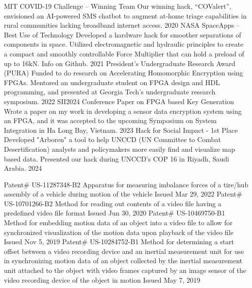 \documentclass[]{awesome-cv}
\begin{document}
\vspace{-15pt}
\begin{cvhonors}
	\cvhonor
	{MIT COVID-19 Challenge – Winning Team}
	{Our winning hack, “COValert”, envisioned an AI-powered SMS chatbot to augment at-home triage capabilities in rural communities lacking broadband internet access.}
	{}
	{2020}
	\cvhonor
	{NASA SpaceApps – Best Use of Technology}
	{Developed a hardware hack for smoother separations of components in space. Utilized electromagnetic and hydraulic principles to create a compact and smoothly controllable Force Multiplier that can hold a preload of up to 16kN. Info on Github.}
	{}
	{2021}
    \cvhonor
	{President's Undergraduate Research Award (PURA)}
	{Funded to do research on Accelerating Homomorphic Encryption using FPGAs. Mentored an undergraduate student on FPGA design and HDL programming, and presented at Georgia Tech's undergraduate research symposium.}
	{}
	{2022}
    \cvhonor
	{SII2024 Conference Paper on FPGA based Key Generation}
	{Wrote a paper on my work in developing a sensor data encryption system using an FPGA, and it was accepted to the upcoming Symposium on System Integration in Ha Long Bay, Vietnam.}
	{}
	{2023}
    \cvhonor
	{Hack for Social Impact - 1st Place}
	{Developed "Arboren" a tool to help UNCCD (UN Committee to Combat Desertification) analysts and policymakers more easily find and visualize map based data. Presented our hack during UNCCD's COP 16 in Riyadh, Saudi Arabia.}
	{}
	{2024}
\end{cvhonors}
\begin{cvhonors}
    \cvhonor
	{Patent\# US-11287348-B2}
	{Apparatus for measuring imbalance forces of a tire/hub assembly of a vehicle during motion of the vehicle}
	{}
	{Issued Mar 29, 2022}
	\cvhonor
	{Patent\# US-10701266-B2}
	{Method for reading out contents of a video file having a predefined video file format}
	{}
	{Issued Jun 30, 2020}
	\cvhonor
	{Patent\# US-10469750-B1}
	{Method for embedding motion data of an object into a video file to allow for synchronized visualization of the motion data upon playback of the video file}
	{}
	{Issued Nov 5, 2019}
	\cvhonor
	{Patent\# US-10284752-B1}
	{Method for determining a start offset between a video recording device and an inertial measurement unit for use in synchronizing motion data of an object collected by the inertial measurement unit attached to the object with video frames captured by an image sensor of the video recording device of the object in motion}
	{}
	{Issued May 7, 2019}
\end{cvhonors}

\ 
\end{document}
